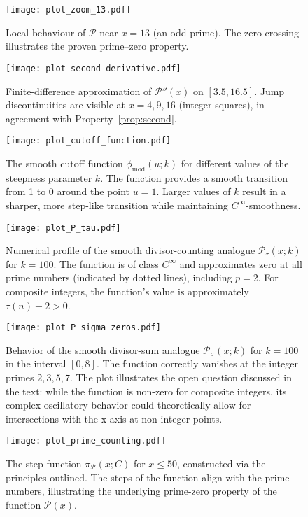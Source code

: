 \documentclass[11pt,a4paper]{amsart}
\newcommand{\Px}{\mathcal{P}}
\theoremstyle{plain}
\theoremstyle{definition}
\begin{document}
\begin{figure}[!htbp]
\centering
\texttt{[image: plot\_zoom\_13.pdf]}
\caption{Local behaviour of $\Px$ near $x=13$ (an odd prime).
The zero crossing illustrates the proven prime–zero property.}
\label{fig:zoom13}
\end{figure}

\begin{figure}[!htbp]
\centering
\texttt{[image: plot\_second\_derivative.pdf]}
\caption{Finite-difference approximation of $\Px''(x)$ on $[3.5,16.5]$.
Jump discontinuities are visible at $x=4,9,16$ (integer squares), in agreement with Property~\ref{prop:second}.}
\label{fig:secondderivative}
\end{figure}

\begin{figure}[!htbp]
\centering
\texttt{[image: plot\_cutoff\_function.pdf]}
\caption{The smooth cutoff function $\phi_{\text{mod}}(u; k)$ for different values of the steepness parameter $k$.
The function provides a smooth transition from 1 to 0 around the point $u=1$.
Larger values of $k$ result in a sharper, more step-like transition while maintaining $C^\infty$-smoothness.}
\label{fig:cutoff}
\end{figure}

\begin{figure}[!htbp]
\centering
\texttt{[image: plot\_P\_tau.pdf]}
\caption{Numerical profile of the smooth divisor-counting analogue $\Px_{\tau}(x; k)$ for $k=100$.
The function is of class $C^\infty$ and approximates zero at all prime numbers (indicated by dotted lines), including $p=2$.
For composite integers, the function's value is approximately $\tau(n)-2 > 0$.}
\label{fig:P_tau}
\end{figure}

\begin{figure}[!htbp]
\centering
\texttt{[image: plot\_P\_sigma\_zeros.pdf]}
\caption{Behavior of the smooth divisor-sum analogue $\Px_{\sigma}(x; k)$ for $k=100$ in the interval $[0, 8]$.
The function correctly vanishes at the integer primes $2, 3, 5, 7$.
The plot illustrates the open question discussed in the text: while the function is non-zero for composite integers, its complex oscillatory behavior could theoretically allow for intersections with the x-axis at non-integer points.}
\label{fig:P_sigma}
\end{figure}

\begin{figure}[!htbp]
\centering
\texttt{[image: plot\_prime\_counting.pdf]}
\caption{The step function $\pi_\Px(x; C)$ for $x\le 50$, constructed via the principles outlined.
The steps of the function align with the prime numbers, illustrating the underlying prime-zero property of the function $\Px(x)$.}
\label{fig:primecounting}
\end{figure}
\end{document}
